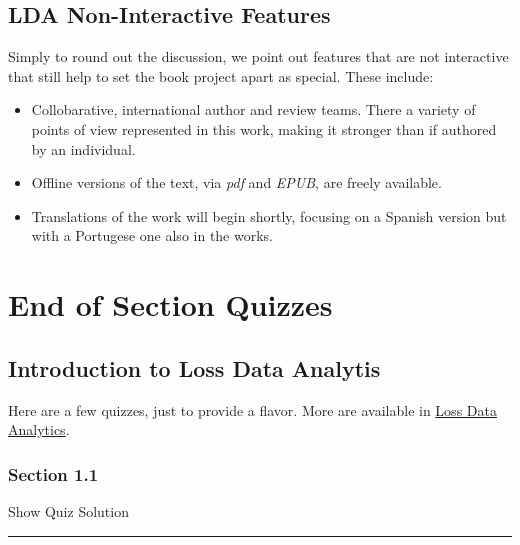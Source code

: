 \documentclass[
]{book}
\providecommand{\tightlist}{%
  \setlength{\itemsep}{0pt}\setlength{\parskip}{0pt}}
\begin{document}
\hypertarget{S:NonFeatures}{%
\section{LDA Non-Interactive Features}\label{S:NonFeatures}}

Simply to round out the discussion, we point out features that are not interactive that still help to set the book project apart as special. These include:

\begin{itemize}
\tightlist
\item
  Collobarative, international author and review teams. There a variety of points of view represented in this work, making it stronger than if authored by an individual.
\item
  Offline versions of the text, via \emph{pdf} and \emph{EPUB}, are freely available.
\item
  Translations of the work will begin shortly, focusing on a Spanish version but with a Portugese one also in the works.
\end{itemize}

\hypertarget{S:EndSectionQuizzes}{%
\chapter{End of Section Quizzes}\label{S:EndSectionQuizzes}}

\hypertarget{introduction-to-loss-data-analytis}{%
\section{Introduction to Loss Data Analytis}\label{introduction-to-loss-data-analytis}}

Here are a few quizzes, just to provide a flavor. More are available in \href{https://openacttexts.github.io/Loss-Data-Analytics/index.html}{Loss Data Analytics}.

\hypertarget{section-1.1}{%
\subsection{Section 1.1}\label{section-1.1}}

\hypertarget{surveyElement11}{}

\hypertarget{surveyResult11}{}

Show Quiz Solution

\hypertarget{display.Quiz11.2}{}
\begin{center}\rule{0.5\linewidth}{0.5pt}\end{center}
\end{document}
